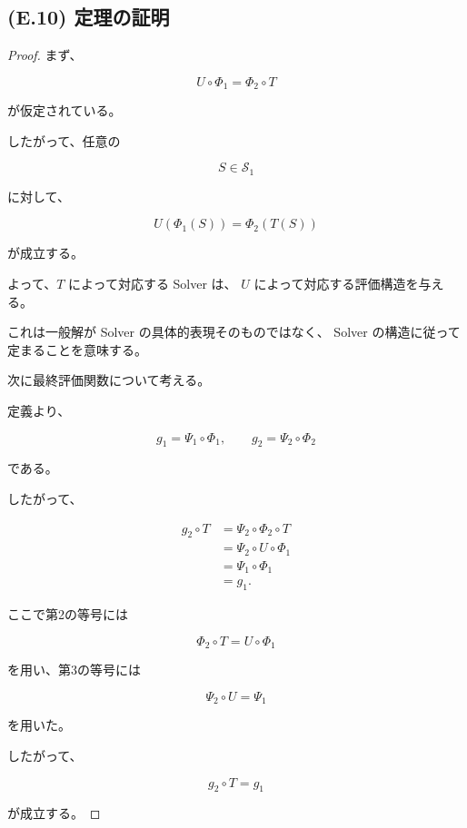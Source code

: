 \documentclass[a4paper,11pt]{article}
\newcommand{\Solver}{\mathcal{S}}
\begin{document}
\subsection{(E.10) 定理の証明}
\label{subsec:E10}

\begin{proof}

まず、

\begin{equation}
    U\circ\Phi_1
    =
    \Phi_2\circ T
\end{equation}

が仮定されている。

したがって、任意の

\begin{equation}
    S\in\Solver_1
\end{equation}

に対して、

\begin{equation}
    U(\Phi_1(S))
    =
    \Phi_2(T(S))
\end{equation}

が成立する。

よって、$T$ によって対応する Solver は、
$U$ によって対応する評価構造を与える。

これは一般解が Solver の具体的表現そのものではなく、
Solver の構造に従って定まることを意味する。

次に最終評価関数について考える。

定義より、

\begin{equation}
    g_1
    =
    \Psi_1\circ\Phi_1,
    \qquad
    g_2
    =
    \Psi_2\circ\Phi_2
\end{equation}

である。

したがって、

\begin{align}
    g_2\circ T
    &=
    \Psi_2\circ\Phi_2\circ T
    \\
    &=
    \Psi_2\circ U\circ\Phi_1
    \\
    &=
    \Psi_1\circ\Phi_1
    \\
    &=
    g_1.
\end{align}

ここで第2の等号には

\begin{equation}
    \Phi_2\circ T
    =
    U\circ\Phi_1
\end{equation}

を用い、第3の等号には

\begin{equation}
    \Psi_2\circ U
    =
    \Psi_1
\end{equation}

を用いた。

したがって、

\begin{equation}
    \boxed{
        g_2\circ T=g_1
    }
\end{equation}

が成立する。
\end{proof}
\end{document}
